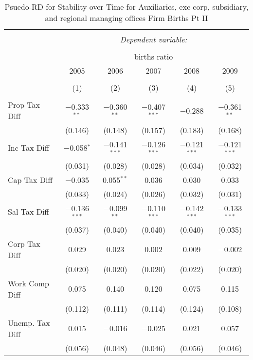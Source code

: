 
\begin{table}[!htbp] \centering 
  \caption{Psuedo-RD for Stability over Time for  Auxiliaries, exc corp, subsidiary, and regional managing offices Firm Births Pt II} 
  \label{95year} 
\small 
\begin{tabular}{@{\extracolsep{5pt}}lccccc} 
\\[-1.8ex]\hline 
\hline \\[-1.8ex] 
 & \multicolumn{5}{c}{\textit{Dependent variable:}} \\ 
\cline{2-6} 
\\[-1.8ex] & \multicolumn{5}{c}{births ratio} \\ 
 & 2005 & 2006 & 2007 & 2008 & 2009 \\ 
\\[-1.8ex] & (1) & (2) & (3) & (4) & (5)\\ 
\hline \\[-1.8ex] 
 Prop Tax Diff & $-$0.333$^{**}$ & $-$0.360$^{**}$ & $-$0.407$^{***}$ & $-$0.288 & $-$0.361$^{**}$ \\ 
  & (0.146) & (0.148) & (0.157) & (0.183) & (0.168) \\ 
  Inc Tax Diff & $-$0.058$^{*}$ & $-$0.141$^{***}$ & $-$0.126$^{***}$ & $-$0.121$^{***}$ & $-$0.121$^{***}$ \\ 
  & (0.031) & (0.028) & (0.028) & (0.034) & (0.032) \\ 
  Cap Tax Diff & $-$0.035 & 0.055$^{**}$ & 0.036 & 0.030 & 0.033 \\ 
  & (0.033) & (0.024) & (0.026) & (0.032) & (0.031) \\ 
  Sal Tax Diff & $-$0.136$^{***}$ & $-$0.099$^{**}$ & $-$0.110$^{***}$ & $-$0.142$^{***}$ & $-$0.133$^{***}$ \\ 
  & (0.037) & (0.040) & (0.040) & (0.040) & (0.035) \\ 
  Corp Tax Diff & 0.029 & 0.023 & 0.002 & 0.009 & $-$0.002 \\ 
  & (0.020) & (0.020) & (0.020) & (0.022) & (0.020) \\ 
  Work Comp Diff & 0.075 & 0.140 & 0.120 & 0.075 & 0.115 \\ 
  & (0.112) & (0.111) & (0.114) & (0.124) & (0.108) \\ 
  Unemp. Tax Diff & 0.015 & $-$0.016 & $-$0.025 & 0.021 & 0.057 \\ 
  & (0.056) & (0.048) & (0.046) & (0.056) & (0.046) \\ 

\end{tabular}
\end{table}
